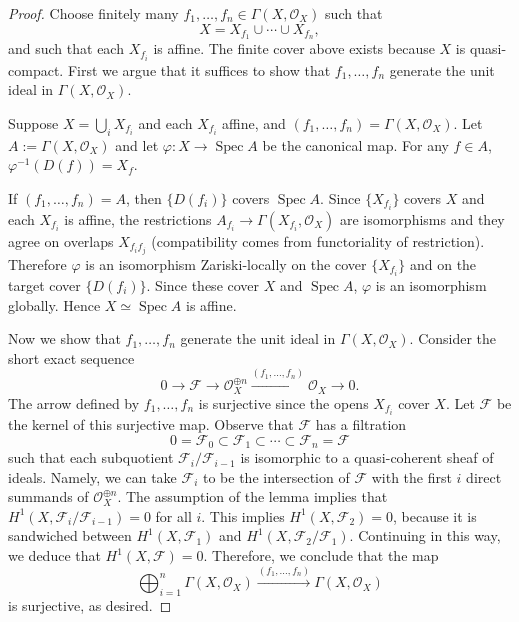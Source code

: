 \documentclass[12pt]{article}
\begin{document}
\begin{proof}
Choose finitely many $f_1,\dots,f_n\in\Gamma(X,\mathcal{O}_X)$ such that 
\[
X = X_{f_1}\cup\cdots\cup X_{f_n},
\]
and such that each $X_{f_i}$ is affine. The finite cover above exists because $X$ is quasi-compact. First we argue that it suffices to show that 
$f_1,\dots,f_n$ generate the unit ideal in $\Gamma(X,\mathcal{O}_X)$. 

Suppose $X=\bigcup_i X_{f_i}$ and each $X_{f_i}$ affine, and
$(f_1,\dots,f_n)=\Gamma(X,\mathcal O_X)$. Let $A:=\Gamma(X,\mathcal O_X)$ and let $\varphi:X\to \operatorname{Spec} A$ be the canonical map. For any $f\in A$, $\varphi^{-1}(D(f))=X_f$.

If $(f_1,\dots,f_n)=A$, then $\{D(f_i)\}$ covers $\operatorname{Spec} A$. Since $\{X_{f_i}\}$ covers $X$ and each $X_{f_i}$ is affine, the restrictions $A_{f_i}\to \Gamma(X_{f_i},\mathcal O_X)$ are isomorphisms and they agree on overlaps $X_{f_if_j}$ (compatibility comes from functoriality of restriction). Therefore $\varphi$ is an isomorphism Zariski-locally on the cover $\{X_{f_i}\}$ and on the target cover $\{D(f_i)\}$. Since these cover $X$ and $\operatorname{Spec} A$, $\varphi$ is an isomorphism globally. Hence $X\simeq \operatorname{Spec} A$ is affine.

Now we show that $f_1,\dots,f_n$ generate the unit ideal in $\Gamma(X,\mathcal{O}_X)$. Consider the short exact sequence
\[
0 \longrightarrow \mathcal{F} \longrightarrow 
\mathcal{O}_X^{\oplus n} 
\xrightarrow{(f_1,\ldots,f_n)} 
\mathcal{O}_X \longrightarrow 0.
\]
The arrow defined by $f_1,\ldots,f_n$ is surjective since the opens $X_{f_i}$ cover $X$. 
Let $\mathcal{F}$ be the kernel of this surjective map. 
Observe that $\mathcal{F}$ has a filtration
\[
0 = \mathcal{F}_0 \subset \mathcal{F}_1 \subset \cdots \subset \mathcal{F}_n = \mathcal{F}
\]
such that each subquotient $\mathcal{F}_i/\mathcal{F}_{i-1}$ 
is isomorphic to a quasi-coherent sheaf of ideals. 
Namely, we can take $\mathcal{F}_i$ to be the intersection of $\mathcal{F}$ 
with the first $i$ direct summands of $\mathcal{O}_X^{\oplus n}$. 
The assumption of the lemma implies that 
$H^1(X,\mathcal{F}_i/\mathcal{F}_{i-1})=0$ for all $i$. 
This implies $H^1(X,\mathcal{F}_2)=0$, because it is sandwiched between 
$H^1(X,\mathcal{F}_1)$ and $H^1(X,\mathcal{F}_2/\mathcal{F}_1)$. 
Continuing in this way, we deduce that $H^1(X,\mathcal{F})=0$. 
Therefore, we conclude that the map
\[
\bigoplus_{i=1}^n \Gamma(X,\mathcal{O}_X)
\xrightarrow{(f_1,\ldots,f_n)} 
\Gamma(X,\mathcal{O}_X)
\]
is surjective, as desired.
\end{proof}
\end{document}
